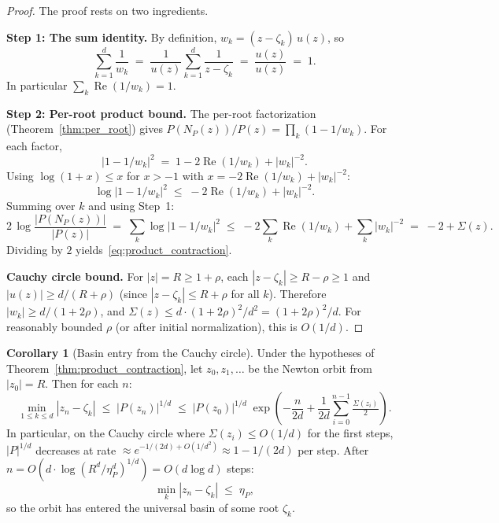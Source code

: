 \documentclass[11pt,a4paper]{article}
\theoremstyle{definition}
\newtheorem{corollary}{Corollary}[section]
\begin{document}
\begin{proof}
The proof rests on two ingredients.

\medskip
\noindent\textbf{Step 1:  The sum identity.}
By definition, $w_k = (z - \zeta_k)\,u(z)$, so
\[
  \sum_{k=1}^d \frac{1}{w_k}
  \;=\; \frac{1}{u(z)}\sum_{k=1}^d \frac{1}{z - \zeta_k}
  \;=\; \frac{u(z)}{u(z)} \;=\; 1.
\]
In particular $\sum_k \operatorname{Re}(1/w_k) = 1$.

\medskip
\noindent\textbf{Step 2:  Per-root product bound.}
The per-root factorization (Theorem~\ref{thm:per_root}) gives $P(N_P(z))/P(z) = \prod_k (1 - 1/w_k)$.  For each factor,
\[
  |1 - 1/w_k|^2 \;=\; 1 - 2\operatorname{Re}(1/w_k) + |w_k|^{-2}.
\]
Using $\log(1 + x) \leq x$ for $x > -1$ with $x = -2\operatorname{Re}(1/w_k) + |w_k|^{-2}$:
\[
  \log|1 - 1/w_k|^2 \;\leq\; -2\operatorname{Re}(1/w_k) + |w_k|^{-2}.
\]
Summing over $k$ and using Step~1:
\[
  2\,\log\frac{|P(N_P(z))|}{|P(z)|}
  \;=\; \sum_k \log|1 - 1/w_k|^2
  \;\leq\; -2\sum_k \operatorname{Re}(1/w_k) + \sum_k |w_k|^{-2}
  \;=\; -2 + \Sigma(z).
\]
Dividing by $2$ yields~\eqref{eq:product_contraction}.

\medskip
\noindent\textbf{Cauchy circle bound.}
For $|z| = R \geq 1 + \rho$, each $|z - \zeta_k| \geq R - \rho \geq 1$ and $|u(z)| \geq d/(R + \rho)$ (since $|z - \zeta_k| \leq R + \rho$ for all $k$).  Therefore $|w_k| \geq d/(1 + 2\rho)$, and $\Sigma(z) \leq d \cdot (1 + 2\rho)^2/d^2 = (1 + 2\rho)^2/d$.  For reasonably bounded $\rho$ (or after initial normalization), this is $O(1/d)$.
\end{proof}

\begin{corollary}[Basin entry from the Cauchy circle]
\label{cor:basin_entry}
Under the hypotheses of Theorem~\ref{thm:product_contraction}, let $z_0, z_1, \ldots$ be the Newton orbit from $|z_0| = R$.  Then for each $n$:
\[
  \min_{1 \leq k \leq d} |z_n - \zeta_k|
  \;\leq\; |P(z_n)|^{1/d}
  \;\leq\; |P(z_0)|^{1/d}\;\exp\!\left(-\frac{n}{2d} + \frac{1}{2d}\sum_{i=0}^{n-1}\tfrac{\Sigma(z_i)}{2}\right).
\]
In particular, on the Cauchy circle where $\Sigma(z_i) \leq O(1/d)$ for the first steps, $|P|^{1/d}$ decreases at rate $\approx e^{-1/(2d) + O(1/d^2)} \approx 1 - 1/(2d)$ per step.  After $n = O(d \cdot \log(R^d/\eta_P^d)^{1/d}) = O(d \log d)$ steps:
\[
  \min_k |z_n - \zeta_k| \;\leq\; \eta_P,
\]
so the orbit has entered the universal basin of some root $\zeta_k$.
\end{corollary}
\end{document}
